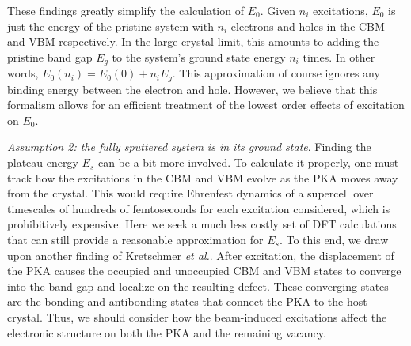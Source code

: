 \documentclass{article}
\begin{document}
These findings greatly simplify the calculation of $E_0$.
Given $n_i$ excitations, $E_0$ is just the energy of the pristine system with
$n_i$ electrons and holes in the CBM and VBM respectively.
In the large crystal limit, this amounts to adding the pristine band gap $E_g$
to the system's ground state energy $n_i$ times.
In other words, $E_0(n_i) = E_0(0) + n_iE_g$.
This approximation of course ignores any binding energy between the electron
and hole.
However, we believe that this formalism allows for an efficient treatment of
the lowest order effects of excitation on $E_0$.

\medskip\noindent
\textit{Assumption 2: the fully sputtered system is in its ground state}.
Finding the plateau energy $E_s$ can be a bit more involved. To calculate it
properly, one must track how the excitations in the CBM and VBM evolve as the
PKA moves away from the crystal.
This would require Ehrenfest dynamics of a supercell over timescales of
hundreds of femtoseconds for each excitation considered, which is
prohibitively expensive.
Here we seek a much less costly set of DFT calculations that can still provide
a reasonable approximation for $E_s$.
To this end, we draw upon another finding of Kretschmer \textit{et al.}.
\cite{Kretschmer2020}
After excitation, the displacement of the PKA causes the occupied and
unoccupied CBM and VBM states to converge into the band gap and localize on the
resulting defect.
These converging states are the bonding and antibonding states that connect the
PKA to the host crystal.
Thus, we should consider how the beam-induced excitations affect the electronic
structure on both the PKA and the remaining vacancy.
\end{document}
